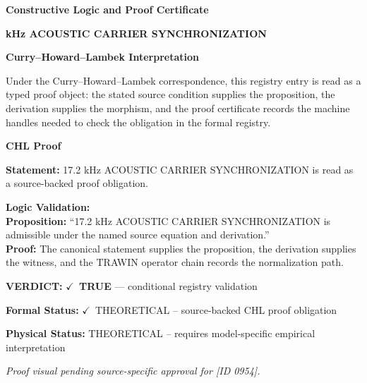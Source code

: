 \clearpage
\begingroup\tzpsupportsetup
\noindent\textbf{\fontsize{10.8pt}{12.8pt}\selectfont [ID 0954] Constructive Logic and Proof Certificate}\par
\noindent\textbf{\fontsize{10pt}{12pt} kHz ACOUSTIC CARRIER SYNCHRONIZATION}\par
\vspace{0.45em}
\begingroup
\footnotesize
\setlength{\parskip}{0.22em}
\setlength{\parindent}{0pt}
\noindent\textbf{Curry--Howard--Lambek Interpretation}\par
Under the Curry--Howard--Lambek correspondence, this registry entry is read as a typed proof
object: the stated source condition supplies the proposition, the derivation supplies the
morphism, and the proof certificate records the machine handles needed to check the obligation
in the formal registry.

\vspace{0.45em}
\noindent\textbf{CHL Proof}\par
\textbf{Statement:} 17.2 kHz ACOUSTIC CARRIER SYNCHRONIZATION is read as a source-backed proof obligation.

\textbf{Logic Validation:}\\
\textbf{Proposition:} ``17.2 kHz ACOUSTIC CARRIER SYNCHRONIZATION is admissible under the named source equation and derivation.''\\
\textbf{Proof:} The canonical statement supplies the proposition, the derivation supplies the witness, and the TRAWIN operator chain records the normalization path.

\textbf{VERDICT:} \ensuremath{\checkmark}\ \textbf{TRUE} --- conditional registry validation

\textbf{Formal Status:} \ensuremath{\checkmark}\ THEORETICAL -- source-backed CHL proof obligation

\textbf{Physical Status:} THEORETICAL -- requires model-specific empirical interpretation
\par\vspace{0.45em}
\par
\vfill
\begingroup\footnotesize\itshape
Proof visual pending source-specific approval for [ID 0954].
\par\endgroup
\vfill
\endgroup
\endgroup
